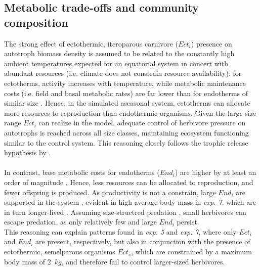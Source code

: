 \subsection{Metabolic trade-offs and community composition}
The strong effect of ectothermic, iteroparous carnivore ($Ect_i$) presence on autotroph biomass density is assumed to be related to the constantly high ambient temperatures expected for an equatorial system in concert with abundant resources (i.e. climate does not constrain resource availability): for ectotherms, activity increases with temperature, while metabolic maintenance costs (i.e. field and basal metabolic rates) are  far lower than for endotherms of similar size \citep{Nagy2005,Buckley2012}. 
Hence, in the simulated aseasonal system, ectotherms can allocate more resources to reproduction than endothermic organisms. 
Given the large size range $Ect_i$ can realize in the model,  adequate control of herbivore pressure on autotrophs is reached across all size classes, maintaining ecosystem functioning similar to the control system. 
This reasoning closely follows the trophic release hypothesis by \cite{Hairston1960}. 
\\\\
In contrast, base metabolic costs for endotherms ($End_i$) are higher by at least an order of magnitude \citep{Nagy2005}. 
Hence, less resources can be allocated to reproduction, and fewer offspring is produced. 
As productivity is not a constrain, large $End_i$ are supported in the system \citep{Smith2011}, evident in high average body mass in \textit{exp. 7}, which are in turn longer-lived \citep{Speakman2005}. 
Assuming size-structred predation \citep{Williams2010}, small herbivores can escape predation, as only relatively few and large $End_i$ persist. \\
This reasoning can explain patterns found in \textit{exp. 5} and \textit{exp. 7}, where only $Ect_i$ and $End_i$ are present, respectively, but also in conjunction with the presence of ectothermic, semelparous organisms  $Ect_s$, which are constrained by a maximum body mass of 2~$kg$, and therefore fail to control larger-sized herbivores. 
%
